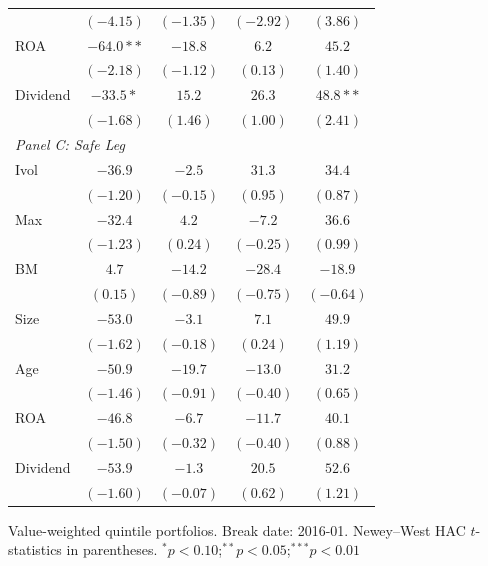 \begin{table}[htbp]
\begin{tabular}{l c c c c}
 & $(-4.15)$ & $(-1.35)$ & $(-2.92)$ & $(3.86)$ \\
ROA & $-64.0**$ & $-18.8$ & $6.2$ & $45.2$ \\
 & $(-2.18)$ & $(-1.12)$ & $(0.13)$ & $(1.40)$ \\
Dividend & $-33.5*$ & $15.2$ & $26.3$ & $48.8**$ \\
 & $(-1.68)$ & $(1.46)$ & $(1.00)$ & $(2.41)$ \\
\midrule
\multicolumn{5}{l}{\textit{Panel C: Safe Leg}} \\
Ivol & $-36.9$ & $-2.5$ & $31.3$ & $34.4$ \\
 & $(-1.20)$ & $(-0.15)$ & $(0.95)$ & $(0.87)$ \\
Max & $-32.4$ & $4.2$ & $-7.2$ & $36.6$ \\
 & $(-1.23)$ & $(0.24)$ & $(-0.25)$ & $(0.99)$ \\
BM & $4.7$ & $-14.2$ & $-28.4$ & $-18.9$ \\
 & $(0.15)$ & $(-0.89)$ & $(-0.75)$ & $(-0.64)$ \\
Size & $-53.0$ & $-3.1$ & $7.1$ & $49.9$ \\
 & $(-1.62)$ & $(-0.18)$ & $(0.24)$ & $(1.19)$ \\
Age & $-50.9$ & $-19.7$ & $-13.0$ & $31.2$ \\
 & $(-1.46)$ & $(-0.91)$ & $(-0.40)$ & $(0.65)$ \\
ROA & $-46.8$ & $-6.7$ & $-11.7$ & $40.1$ \\
 & $(-1.50)$ & $(-0.32)$ & $(-0.40)$ & $(0.88)$ \\
Dividend & $-53.9$ & $-1.3$ & $20.5$ & $52.6$ \\
 & $(-1.60)$ & $(-0.07)$ & $(0.62)$ & $(1.21)$ \\
\bottomrule
\end{tabular}
\vspace{4pt}
\begin{minipage}{0.9\textwidth}
\footnotesize
Value-weighted quintile portfolios. Break date: 2016-01.
Newey--West HAC $t$-statistics in parentheses.
$^{*}p<0.10$;\quad $^{**}p<0.05$;\quad $^{***}p<0.01$
\end{minipage}
\end{table}
